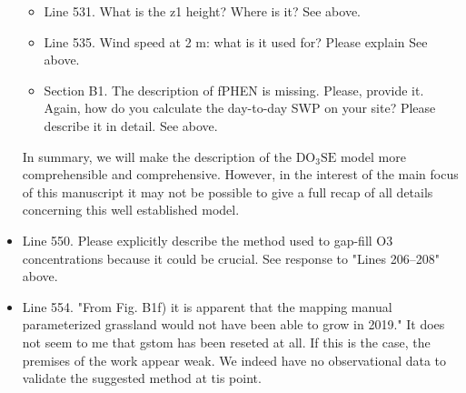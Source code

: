 \documentclass{scrartcl}
\begin{document}
\begin{itemize}
{\begin{itemize}
    \item Line 531. What is the z1 height? Where is it?
    {\color{black}See above.}

    \item Line 535. Wind speed at 2 m: what is it used for? Please explain
    {\color{black}See above.}

    \item Section B1. The description of fPHEN is missing. Please, provide it. Again, how do you calculate the day-to-day SWP on your site? Please describe it in detail.
    {\color{black}See above.}
    
\end{itemize} }
In summary, we will make the description of the $\mathrm{DO_3SE}$ model more comprehensible and comprehensive. However, in the interest of the main focus of this manuscript it may not be possible to give a full recap of all details concerning this well established model.

\item {\color{blue}Line 550. Please explicitly describe the method used to gap-fill O3 concentrations because it could be crucial.}
See response to "Lines 206--208" above.


\item {\color{blue}Line 554. "From Fig. B1f) it is apparent that the mapping manual parameterized grassland would not have been able to grow in 2019." 
It does not seem to me that gstom has been reseted at all. If this is the case, the premises of the work appear weak.}
We indeed have no observational data to validate the suggested method at tis point.

\end{itemize}
\end{document}

